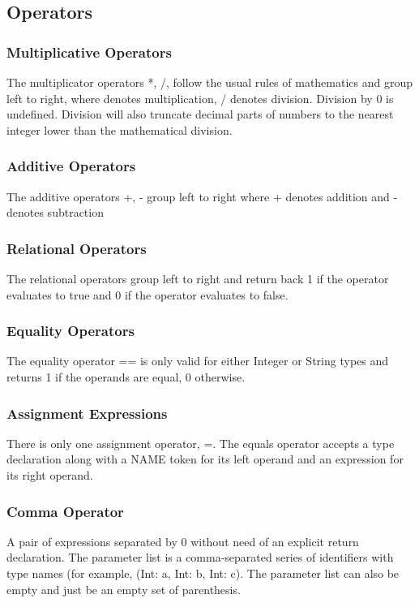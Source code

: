 \documentclass[12pt]{article}
\begin{document}
\subsection{Operators}

\subsubsection{Multiplicative Operators}
The multiplicator operators *, /, follow the usual rules of mathematics and group left to right, where \* denotes multiplication, / denotes division. Division by 0 is undefined.  Division will also truncate decimal parts of numbers to the nearest integer lower than the mathematical division.

\subsubsection{Additive Operators}
The additive operators +, - group left to right where + denotes addition and - denotes subtraction

\subsubsection{Relational Operators}
The relational operators group left to right and return back 1 if the operator evaluates to true and 0 if the operator evaluates to false. 
 
\subsubsection{Equality Operators}
The equality operator == is only valid for either Integer or String types and returns 1 if the operands are equal, 0 otherwise. 

\subsubsection{Assignment Expressions}
There is only one assignment operator, =.  The equals operator accepts a type declaration along with a NAME token for its left operand and an expression for its right operand. 
 
\subsubsection{Comma Operator}
A pair of expressions separated by 0 without need of an explicit return declaration. The parameter list is a comma-separated series of identifiers with type names (for example, (Int: a, Int: b, Int: c).  The parameter list can also be empty and just be an empty set of parenthesis. 
\end{document}
